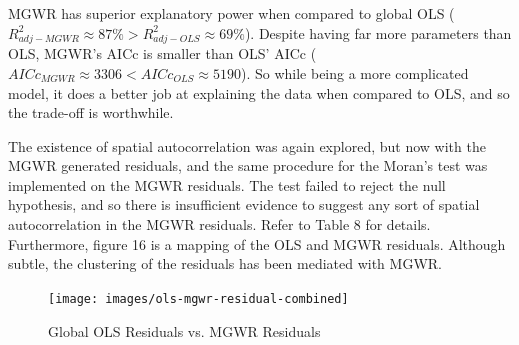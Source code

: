\documentclass[
]{article}
\begin{document}
MGWR has superior explanatory power when compared to global OLS
(\(R_{adj-MGWR}^{2} \approx 87\% > R_{adj-OLS}^{2} \approx 69\%\)).
Despite having far more parameters than OLS, MGWR's AICc is smaller than
OLS' AICc (\(AICc_{MGWR} \approx 3306 < AICc_{OLS} \approx 5190\)). So
while being a more complicated model, it does a better job at explaining
the data when compared to OLS, and so the trade-off is worthwhile.

\newpage

The existence of spatial autocorrelation was again explored, but now
with the MGWR generated residuals, and the same procedure for the
Moran's test was implemented on the MGWR residuals. The test failed to
reject the null hypothesis, and so there is insufficient evidence to
suggest any sort of spatial autocorrelation in the MGWR residuals. Refer
to Table 8 for details. Furthermore, figure 16 is a mapping of the OLS
and MGWR residuals. Although subtle, the clustering of the residuals has
been mediated with MGWR.

\begin{table}[H]
\renewcommand{\arraystretch}{1.3} %
\setlength{\tabcolsep}{12pt} %
\centering
\caption{MGWR Residual Moran's I Test Results}
\label{tab:mgwr_morans_i}
\end{table}

\begin{figure}[H]

{\centering \texttt{[image: images/ols-mgwr-residual-combined]} 

}

\caption{Global OLS Residuals vs. MGWR Residuals}\label{fig:unnamed-chunk-20}
\end{figure}
\end{document}

